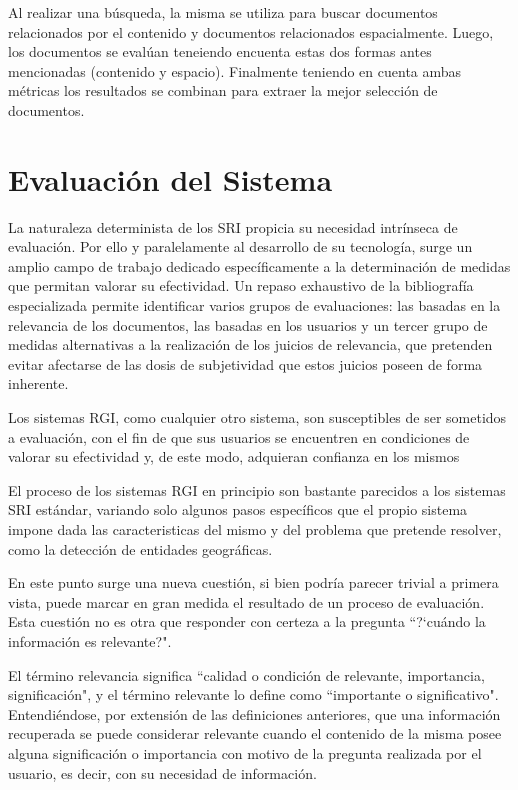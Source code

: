 \documentclass{llncs}
\begin{document}
Al realizar una búsqueda, la misma se utiliza para buscar documentos
relacionados por el contenido y documentos relacionados espacialmente. Luego,
los documentos se evalúan teneiendo encuenta estas dos formas antes mencionadas
(contenido y espacio). Finalmente teniendo en cuenta ambas métricas los
resultados se combinan para extraer la mejor selección de documentos.

\section{Evaluación del Sistema}\label{sec:eval}

La naturaleza determinista de los SRI propicia su necesidad intrínseca de
evaluación. Por ello y paralelamente al desarrollo de su tecnología, surge un
amplio campo de trabajo dedicado específicamente a la determinación de medidas
que permitan valorar su efectividad. Un repaso exhaustivo de la bibliografía
especializada permite identificar varios grupos de evaluaciones: las basadas
en la relevancia de los documentos, las basadas en los usuarios y un tercer
grupo de medidas alternativas a la realización de los juicios de relevancia,
que pretenden evitar afectarse de las dosis de subjetividad que estos juicios
poseen de forma inherente.

Los sistemas RGI, como cualquier otro sistema, son susceptibles de ser
sometidos a evaluación, con el fin de que sus usuarios se encuentren en
condiciones de valorar su efectividad y, de este modo, adquieran confianza
en los mismos

El proceso de los sistemas RGI en principio son bastante parecidos a los 
sistemas SRI estándar, variando solo algunos pasos específicos que el propio
sistema impone dada las caracteristicas del mismo y del problema que pretende
resolver, como la detección de entidades geográficas. \cite{Kornai2005}

En este punto surge una nueva cuestión, si bien podría parecer trivial a
primera vista, puede marcar en gran medida el resultado de un proceso de
evaluación. Esta cuestión no es otra que responder con certeza a la pregunta
``?`cuándo la información es relevante?".

El término relevancia significa ``calidad o condición de relevante,
importancia, significación", y el término relevante lo define como
``importante o significativo". Entendiéndose, por extensión de las definiciones
anteriores, que una información recuperada se puede considerar relevante
cuando el contenido de la misma posee alguna significación o importancia
con motivo de la pregunta realizada por el usuario, es decir, con su
necesidad de información.
\end{document}
